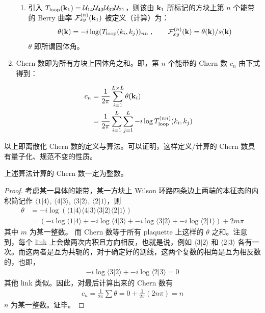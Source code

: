 \begin{enumerate}
\begin{enumerate}
\item 引入 $T_{\text{loop}}(\mathbf{k}_1) = \mathcal{U}_{14}\mathcal{U}_{43}\mathcal{U}_{32}\mathcal{U}_{21}$，则该由 $\mathbf{k}_1$ 所标记的方块上第 $n$ 个能带的 Berry 曲率 $\mathcal{F}_{xy}^{(n)}(\mathbf{k}_1)$ 被定义（计算）为：
\begin{align}
\theta(\mathbf{k}) = -i \log(T_{\text{loop}}(k_i, k_j))_{nn}\; ,
\qquad    
\mathcal{F}_{xy}^{(n)}(\mathbf{k}) = \theta(\mathbf{k}) / s(\mathbf{k})
\end{align}
$\theta$ 即所谓固体角。

\end{enumerate}

\item Chern 数即为所有方块上固体角之和。即，第 $n$ 个能带的 Chern 数 $c_n$ 由下式得到：

\begin{align}
c_n &= \frac{1}{2\pi} \sum_{i=1}^{L\times L} \theta(\mathbf{k}_i) \notag \\ 
&= \frac{1}{2\pi}\sum_{i=1}^{L}\sum_{j=1}^{L} -i \log T_{\text{loop}}^{(nn)}(k_i, k_j)
\end{align}

\end{enumerate}

以上即离散化 Chern 数的定义与算法。可以证明，这样定义/计算的 Chern 数具有量子化、规范不变的性质。

\begin{theorem}
上述算法计算的 Chern 数一定为整数。
\end{theorem}

\begin{proof}
考虑某一具体的能带，某一方块上 Wilson 环路四条边上两端的本征态的内积简记作 $\langle1|4\rangle$, $\langle4|3\rangle$, $\langle3|2\rangle$, $\langle2|1\rangle$，则
\begin{align}
\theta &= -i\log (\langle1|4\rangle\langle4|3\rangle\langle3|2\rangle\langle2|1\rangle) \\ 
&= (-i\log \langle1|4\rangle + -i\log \langle4|3\rangle + -i\log \langle3|2\rangle + -i\log \langle2|1\rangle) + 2m\pi
\end{align}
其中 $m$ 为某一整数。
而 Chern 数等于所有 plaquette 上这样的 $\theta$ 之和。注意到，每个 link 上会做两次内积且方向相反，也就是说，例如 $\langle3|2\rangle$ 和 $\langle2|3\rangle$ 各有一次。而这两者是互为共轭的，对于确定好的割线，这两个复数的相角是互为相反数的，也即，
\begin{align}
-i\log \langle3|2\rangle + -i\log\langle2|3\rangle = 0
\end{align}
其他 link 类似。因此，对最后计算出来的 Chern 数有
\begin{align}
c_n = \frac{1}{2\pi}\sum \theta = 0 + \frac{1}{2\pi}(2n\pi) = n
\end{align}
$n$ 为某一整数。证毕。
\end{proof}



